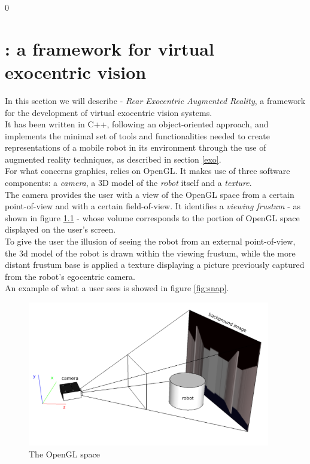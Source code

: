 \setcounter{figure}{0}
\setcounter{table}{0}
\setcounter{lstlisting} {0}

\chapter{\framework{}: a framework for virtual exocentric vision}
\label{rear}
\minitoc

In this section we will describe \framework{} - 
\textit{Rear Exocentric Augmented Reality}, a framework 
for the development of virtual exocentric vision systems.
\\
It has been written in C++, following an object-oriented 
approach, and implements the minimal set of tools and functionalities 
needed to create representations of a mobile robot in its environment 
through the use of augmented reality techniques, as described in 
section \ref{exo}.
\\
For what concerns graphics, \framework{} relies on OpenGL.
It makes use of three software components: a \textit{camera}, 
a 3D model of the \textit{robot} itself and a \textit{texture}.
\\
The camera provides the user with a view of the OpenGL space 
from a certain point-of-view and with a certain field-of-view. 
It identifies a \textit{viewing frustum} - as shown in figure 
\ref{fig:openglspace} - whose volume corresponds to the 
portion of OpenGL space displayed on the user's screen.
\\
To give the user the illusion of seeing the robot from an 
external point-of-view, the 3d model of the robot is drawn 
within the viewing frustum, while the more distant frustum base 
is applied a texture displaying a picture previously 
captured from the robot's egocentric camera.
\\
An example of what a user sees is showed in figure \ref{fig:snap}.

\begin{figure}[!h]
  \begin{center}
    \includegraphics[width=300pt]{img/camera_frustum_scheme.png}
    \caption{The OpenGL space}
    \label{fig:openglspace}
  \end{center}
\end{figure}

